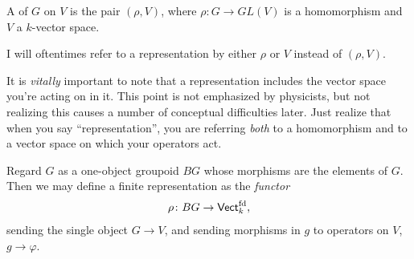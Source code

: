 \documentclass[11pt]{article}
\begin{document}
\begin{definition}
    A  of $G$ on $V$ is the pair $(\rho, V)$,
    where $\rho \colon G \to GL(V)$ is a homomorphism and $V$
    a $k$-vector space.
\end{definition}

\begin{nnote}
    I will oftentimes refer to a representation by either $\rho$
    or $V$ instead of $(\rho, V)$.
\end{nnote}

\begin{reemark}
    It is \emph{vitally} important to note that a representation includes the
    vector space you're acting on in it. This point is not emphasized by
    physicists, but not realizing this causes a number of conceptual
    difficulties later. Just realize that when you say ``representation'',
    you are referring \emph{both} to a homomorphism and to a vector space
    on which your operators act.
\end{reemark}

\begin{nnote}
    Regard $G$ as a one-object groupoid $BG$ whose morphisms
    are the elements of $G$. Then we may define a finite representation 
    as the \emph{functor}
    \begin{align*}
        \rho \colon BG \to \text{\sffamily{Vect}}_k^{\rm fd},
    \end{align*}
    sending the single object $G \to V$, and sending morphisms
    in $g$ to operators on $V$, $g \to \varphi$.
\end{nnote}
\end{document}
